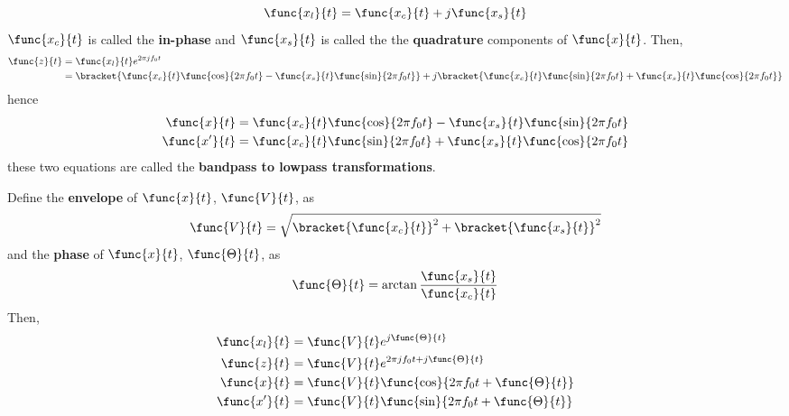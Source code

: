 \begin{equation*}
    \func{x_l}{t} = \func{x_c}{t} + j \func{x_s}{t}
\end{equation*}
\(\func{x_c}{t}\) is called the \textbf{in-phase} and \(\func{x_s}{t}\) is called the the \textbf{quadrature} components of \(\func{x}{t}\). Then, 
\begin{align*}
    \func{z}{t} &= \func{x_l}{t} e^{2\pi j f_0 t}\\
    &= \bracket{\func{x_c}{t} \func{\cos}{2 \pi f_0 t} - \func{x_s}{t} \func{\sin}{2 \pi f_0 t}} + j \bracket{\func{x_c}{t} \func{\sin}{2 \pi f_0 t} + \func{x_s}{t} \func{\cos}{2 \pi f_0 t}} 
\end{align*}
hence 
\begin{align*}
    \func{x}{t} &= \func{x_c}{t} \func{\cos}{2 \pi f_0 t} - \func{x_s}{t} \func{\sin}{2 \pi f_0 t}\\
    \func{x'}{t} &= \func{x_c}{t} \func{\sin}{2 \pi f_0 t} + \func{x_s}{t} \func{\cos}{2 \pi f_0 t}
\end{align*}
these two equations are called the \textbf{bandpass to lowpass transformations}.

Define the \textbf{envelope} of \(\func{x}{t}\), \(\func{V}{t}\), as 
\begin{equation*}
    \func{V}{t} = \sqrt{\bracket{\func{x_c}{t}}^2 + \bracket{\func{x_s}{t}}^2}
\end{equation*}
and the \textbf{phase} of \(\func{x}{t}\), \(\func{\Theta}{t}\), as 
\begin{equation*}
    \func{\Theta}{t} = \arctan \dfrac{\func{x_s}{t}}{\func{x_c}{t}}
\end{equation*}
Then, 
\begin{align*}
    \func{x_l}{t} &= \func{V}{t} e^{j \func{\Theta}{t}}\\
    \func{z}{t} &= \func{V}{t} e^{2\pi j f_0 t +  j\func{\Theta}{t}}\\
    \func{x}{t} &= \func{V}{t} \func{\cos}{2\pi f_0 t + \func{\Theta}{t}}\\
    \func{x'}{t} &= \func{V}{t} \func{\sin}{2\pi f_0 t + \func{\Theta}{t}}
\end{align*}
